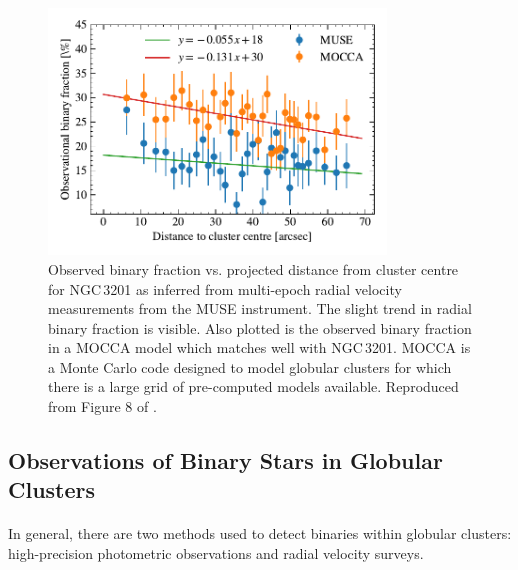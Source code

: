 \begin{figure}
	\centering
	\includegraphics[width=0.8\textwidth]{figures/radial_binarity.pdf}
	\caption{Observed binary fraction vs. projected distance from cluster centre for NGC\,3201 as
		inferred from multi-epoch radial velocity measurements from the MUSE instrument.
		The slight trend in radial binary fraction is visible. Also plotted is the observed
		binary fraction in a MOCCA model which matches well with NGC\,3201. MOCCA is a Monte
		Carlo code designed to model globular clusters for which there is a large grid of
		pre-computed models available. Reproduced from Figure 8 of \citet{Giesers2019}.}
	\label{fig:1/radial_binary_fraction}
\end{figure}

\subsection{Observations of Binary Stars in Globular Clusters}

\paragraph{}
In general, there are two methods used to detect binaries within globular clusters: high-precision
photometric observations and radial velocity surveys.


